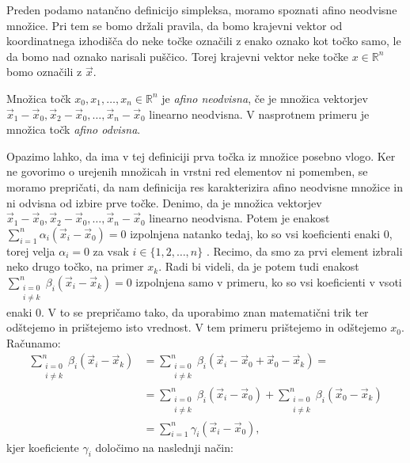 \documentclass[mat1]{fmfdelo}
\newcommand{\R}{\mathbb R}
\newcommand{\0}{\underline{0}}
\begin{document}
Preden podamo natančno definicijo simpleksa, moramo spoznati afino neodvisne množice. Pri tem se bomo držali pravila, da bomo krajevni vektor od koordinatnega izhodišča do neke točke označili z enako oznako kot točko samo, le da bomo nad oznako narisali puščico. Torej krajevni vektor neke točke $x \in \R^n$ bomo označili z $\vec{x}$.
\begin{definicija}
Množica točk $x_0, x_1, \dots , x_n \in \R^n$ je \emph{afino neodvisna}, če je množica vektorjev $\vec{x}_1 - \vec{x}_0, \vec{x}_2 - \vec{x}_0, \dots , \vec{x}_n - \vec{x}_0$ linearno neodvisna. V nasprotnem primeru je množica točk \emph{afino odvisna}.
\end{definicija}

Opazimo lahko, da ima v tej definiciji prva točka iz množice posebno vlogo. Ker ne govorimo o urejenih množicah in vrstni red elementov ni pomemben, se moramo prepričati, da nam definicija res karakterizira afino neodvisne množice in ni odvisna od izbire prve točke. Denimo, da je množica vektorjev $\vec{x}_1 - \vec{x}_0, \vec{x}_2 - \vec{x}_0, \dots , \vec{x}_n - \vec{x}_0$ linearno neodvisna. Potem je enakost $\sum\limits_{i=1}^n \alpha_i (\vec{x}_i - \vec{x}_0) = 0$ izpolnjena natanko tedaj, ko so vsi koeficienti enaki $0$, torej velja $\alpha_i = 0$ za vsak $i \in \{ 1, 2, \dots, n \}$ . Recimo, da smo za prvi element izbrali neko drugo točko, na primer $x_k$. Radi bi videli, da je potem tudi enakost $\sum\limits_{\substack{i=0 \\ i\neq k}}^n \beta_i (\vec{x}_i - \vec{x}_k) = 0$ izpolnjena samo v primeru, ko so vsi koeficienti v vsoti enaki $0$. V to se prepričamo tako, da uporabimo znan matematični trik ter odštejemo in prištejemo isto vrednost. V tem primeru prištejemo in odštejemo $x_0$.
Računamo:
\begin{align*} 
\sum\limits_{\substack{i=0 \\ i \neq k}}^n \beta_i (\vec{x}_i - \vec{x}_k) &=  \sum\limits_{\substack{i=0 \\ i \neq k}}^n \beta_i (\vec{x}_i - \vec{x}_0 + \vec{x}_0 - \vec{x}_k) = \\
&=\sum\limits_{\substack{i=0 \\ i\neq k}}^n \beta_i (\vec{x}_i - \vec{x}_0) + \sum\limits_{\substack{i=0 \\ i\neq k}}^n \beta_i (\vec{x}_0 - \vec{x}_k) \\
&= \sum\limits_{i=1}^n \gamma_i (\vec{x}_i - \vec{x}_0),
\end{align*}
kjer koeficiente $\gamma_i$ določimo na naslednji način:
\end{document}
